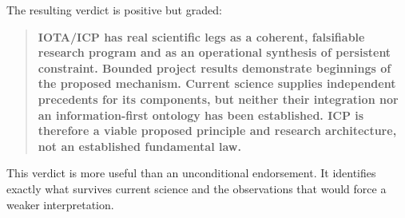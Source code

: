 The resulting verdict is positive but graded:

\begin{quote}
\textbf{IOTA/ICP has real scientific legs as a coherent, falsifiable research
program and as an operational synthesis of persistent constraint. Bounded
project results demonstrate beginnings of the proposed mechanism. Current
science supplies independent precedents for its components, but neither their
integration nor an information-first ontology has been established. ICP is
therefore a viable proposed principle and research architecture, not an
established fundamental law.}
\end{quote}

This verdict is more useful than an unconditional endorsement. It identifies
exactly what survives current science and the observations that would force a
weaker interpretation.
